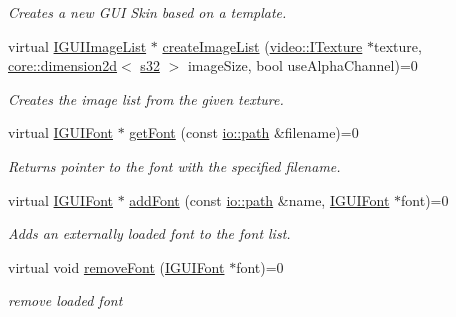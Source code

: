 \begin{DoxyCompactItemize}
\begin{DoxyCompactList}\small\item\em Creates a new G\+UI Skin based on a template. \end{DoxyCompactList}\item 
virtual \hyperlink{classirr_1_1gui_1_1IGUIImageList}{I\+G\+U\+I\+Image\+List} $\ast$ \hyperlink{classirr_1_1gui_1_1IGUIEnvironment_af3bd793f81b15dc534648e8a37e76467}{create\+Image\+List} (\hyperlink{classirr_1_1video_1_1ITexture}{video\+::\+I\+Texture} $\ast$texture, \hyperlink{classirr_1_1core_1_1dimension2d}{core\+::dimension2d}$<$ \hyperlink{namespaceirr_ac66849b7a6ed16e30ebede579f9b47c6}{s32} $>$ image\+Size, bool use\+Alpha\+Channel)=0
\begin{DoxyCompactList}\small\item\em Creates the image list from the given texture. \end{DoxyCompactList}\item 
virtual \hyperlink{classirr_1_1gui_1_1IGUIFont}{I\+G\+U\+I\+Font} $\ast$ \hyperlink{classirr_1_1gui_1_1IGUIEnvironment_a22074f9a1a5a86d5d216126bbb90b3b1}{get\+Font} (const \hyperlink{namespaceirr_1_1io_a6468281622ce3a1c46b72e19f32dded5}{io\+::path} \&filename)=0
\begin{DoxyCompactList}\small\item\em Returns pointer to the font with the specified filename. \end{DoxyCompactList}\item 
virtual \hyperlink{classirr_1_1gui_1_1IGUIFont}{I\+G\+U\+I\+Font} $\ast$ \hyperlink{classirr_1_1gui_1_1IGUIEnvironment_a2c4fefb8a67fc92aedbbff6254532c2b}{add\+Font} (const \hyperlink{namespaceirr_1_1io_a6468281622ce3a1c46b72e19f32dded5}{io\+::path} \&name, \hyperlink{classirr_1_1gui_1_1IGUIFont}{I\+G\+U\+I\+Font} $\ast$font)=0
\begin{DoxyCompactList}\small\item\em Adds an externally loaded font to the font list. \end{DoxyCompactList}\item 
\mbox{\label{classirr_1_1gui_1_1IGUIEnvironment_a414f61b6901e7328448247648fdf9375}} 
virtual void \hyperlink{classirr_1_1gui_1_1IGUIEnvironment_a414f61b6901e7328448247648fdf9375}{remove\+Font} (\hyperlink{classirr_1_1gui_1_1IGUIFont}{I\+G\+U\+I\+Font} $\ast$font)=0
\begin{DoxyCompactList}\small\item\em remove loaded font \end{DoxyCompactList}\item 

\end{DoxyCompactItemize}
